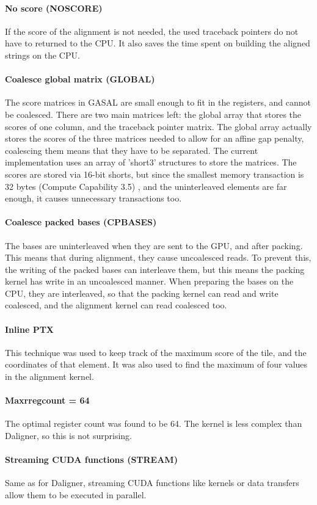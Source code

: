 \documentclass[../thesis.tex]{subfiles}
\begin{document}
\paragraph{No score (NOSCORE)}
If the score of the alignment is not needed, the used traceback pointers do not have to returned to the CPU.
It also saves the time spent on building the aligned strings on the CPU.


\paragraph{Coalesce global matrix (GLOBAL)}
The score matrices in GASAL are small enough to fit in the registers, and cannot be coalesced.
There are two main matrices left: the global array that stores the scores of one column, and the traceback pointer matrix.
The global array actually stores the scores of the three matrices needed to allow for an affine gap penalty, coalescing them means that they have to be separated.
The current implementation uses an array of 'short3' structures to store the matrices.
The scores are stored via 16-bit shorts, but since the smallest memory transaction is 32 bytes (Compute Capability 3.5) \cite{cuda}, and the uninterleaved elements are far enough, it causes unnecessary transactions too.


\paragraph{Coalesce packed bases (CPBASES)}
The bases are uninterleaved when they are sent to the GPU, and after packing.
This means that during alignment, they cause uncoalesced reads.
To prevent this, the writing of the packed bases can interleave them, but this means the packing kernel has write in an uncoalesced manner.
When preparing the bases on the CPU, they are interleaved, so that the packing kernel can read and write coalesced, and the alignment kernel can read coalesced too.

\paragraph{Inline PTX}
This technique was used to keep track of the maximum score of the tile, and the coordinates of that element.
It was also used to find the maximum of four values in the alignment kernel.

\paragraph{Maxrregcount = 64}
The optimal register count was found to be 64.
The kernel is less complex than Daligner, so this is not surprising.

\paragraph{Streaming CUDA functions (STREAM)}
Same as for Daligner, streaming CUDA functions like kernels or data transfers allow them to be executed in parallel.
\end{document}
